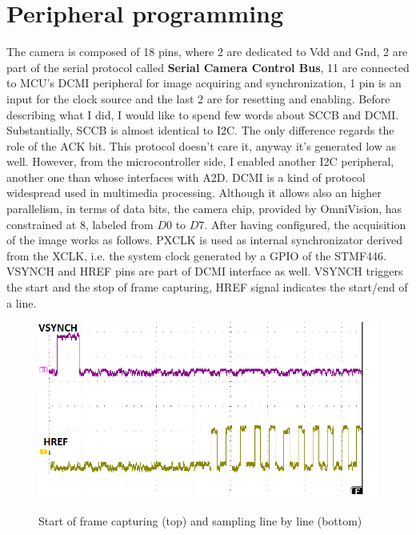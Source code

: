 \section{Peripheral programming}

The camera is composed of 18 pins, where 2 are dedicated to Vdd and Gnd, 2 are part of the serial protocol called \textbf{Serial Camera Control Bus}, 11 are connected to MCU's DCMI peripheral for image acquiring and synchronization, 1 pin is an input for the clock source and the last 2 are for resetting and enabling. Before describing what I did, I would like to spend few words about SCCB and DCMI.
\newline
\newline
Substantially, SCCB is almost identical to I2C. The only difference regards the role of the ACK bit. This protocol doesn't care it, anyway it's generated low as well. However, from the microcontroller side, I enabled another I2C peripheral, another one than whose interfaces with A2D.
\newline
\newline
DCMI is a kind of protocol widespread used in multimedia processing. Although it allows also an higher parallelism, in terms of data bits, the camera chip, provided by OmniVision, has constrained at 8, labeled from $D0$ to $D7$. After having configured, the acquisition of the image works as follows. PXCLK is used as internal synchronizator derived from the XCLK, i.e. the system clock generated by a GPIO of the STMF446. VSYNCH and HREF pins are part of DCMI interface as well. VSYNCH triggers the start and the stop of frame capturing, HREF signal indicates the start/end of a line.

\begin{figure}[H]
\centering
\includegraphics[scale=.9]{Immagini/08}
\label{08}
\caption{Start of frame capturing (top) and sampling line by line (bottom)}
\end{figure}

